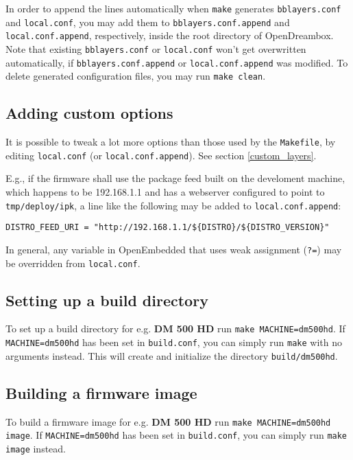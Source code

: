 \documentclass[a4paper]{article}
\newcommand{\shell}[1]{\texttt{\small #1}}
\begin{document}
     In order to append the lines automatically when \shell{make} generates
     \shell{bblayers.conf} and \shell{local.conf}, you may add them to
     \shell{bblayers.conf.append} and \shell{local.conf.append}, respectively,
     inside the root directory of OpenDreambox. Note that existing \shell{bblayers.conf}
     or \shell{local.conf} won't get overwritten automatically, if \shell{bblayers.conf.append}
     or \shell{local.conf.append} was modified. To delete generated configuration
     files, you may run \shell{make clean}.

  \subsection{Adding custom options}
     It is possible to tweak a lot more options than those used by the
     \shell{Makefile}, by editing \shell{local.conf} (or
     \shell{local.conf.append}). See section \ref{custom_layers}.

     E.g., if the firmware shall use the package feed built on the develoment machine, which
     happens to be 192.168.1.1 and has a webserver configured to point to \shell{tmp/deploy/ipk},
     a line like the following may be added to \shell{local.conf.append}:

     \shell{DISTRO\_FEED\_URI = "http://192.168.1.1/\$\{DISTRO\}/\$\{DISTRO\_VERSION\}"}

     In general, any variable in OpenEmbedded that uses weak assignment (\shell{?=}) may be
     overridden from \shell{local.conf}.

  \subsection{Setting up a build directory}
     To set up a build directory for e.g. \textbf{DM 500 HD} run \shell{make MACHINE=dm500hd}. If
     \shell{MACHINE=dm500hd} has been set in \shell{build.conf}, you can simply run \shell{make}
     with no arguments instead. This will create and initialize the directory \shell{build/dm500hd}.

  \subsection{Building a firmware image}
     To build a firmware image for e.g. \textbf{DM 500 HD} run \shell{make MACHINE=dm500hd image}.
     If \shell{MACHINE=dm500hd} has been set in \shell{build.conf}, you can simply run
     \shell{make image} instead.
\end{document}
